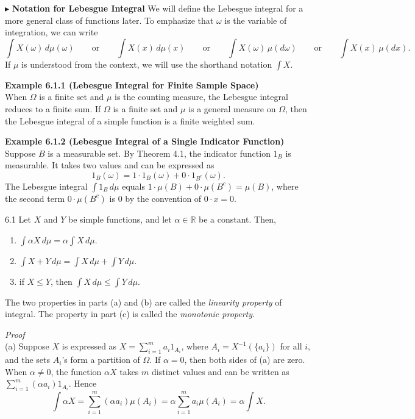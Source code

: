 \noindent$\blacktriangleright$ \textbf{Notation for Lebesgue Integral} We will define the Lebesgue integral for a more general class of functions later. To emphasize that $\omega$ is the variable of integration, we can write
\[
\int X(\omega)\, d\mu(\omega)
\qquad \text{or} \qquad
\int X(x)\, d\mu(x)
\qquad \text{or} \qquad
\int X(\omega)\, \mu(d\omega)
\qquad \text{or} \qquad
\int X(x)\, \mu(dx).
\]
If $\mu$ is understood from the context, we will use the shorthand notation $\int X$.

\textbf{Example 6.1.1 (Lebesgue Integral for Finite Sample Space)} \\
When $\Omega$ is a finite set and $\mu$ is the counting measure, the Lebesgue integral reduces to a finite sum. If $\Omega$ is a finite set and $\mu$ is a general measure on $\Omega$, then the Lebesgue integral of a simple function is a finite weighted sum.

\textbf{Example 6.1.2 (Lebesgue Integral of a Single Indicator Function)} \\
Suppose $B$ is a measurable set. By Theorem 4.1, the indicator function $1_B$ is measurable. It takes two values and can be expressed as
\[
1_B(\omega)=1\cdot 1_B(\omega)+0\cdot 1_{B^c}(\omega).
\]
The Lebesgue integral $\int 1_B\, d\mu$ equals $1\cdot \mu(B)+0\cdot \mu(B^c)=\mu(B)$, where the second term $0\cdot \mu(B^c)$ is $0$ by the convention of $0\cdot x=0$.

\begin{thmbox}{6.1}
Let $X$ and $Y$ be simple functions, and let $\alpha \in \mathbb{R}$ be a constant. Then,
\begin{enumerate}[label=(\alph*)]
    \item $\int \alpha X\, d\mu = \alpha \int X\, d\mu$.
    \item $\int X+Y\, d\mu = \int X\, d\mu + \int Y\, d\mu$.
    \item if $X\le Y$, then $\int X\, d\mu \le \int Y\, d\mu$.
\end{enumerate}
\end{thmbox}

The two properties in parts (a) and (b) are called the \textit{linearity property} of integral. The property in part (c) is called the \textit{monotonic property}.

\textit{Proof} \\
(a) Suppose $X$ is expressed as $X=\sum_{i=1}^{m} a_i 1_{A_i}$, where $A_i=X^{-1}(\{a_i\})$ for all $i$, and the sets $A_i$'s form a partition of $\Omega$. If $\alpha=0$, then both sides of (a) are zero. When $\alpha\neq 0$, the function $\alpha X$ takes $m$ distinct values and can be written as $\sum_{i=1}^{m} (\alpha a_i)1_{A_i}$. Hence
\[
\int \alpha X = \sum_{i=1}^{m} (\alpha a_i)\mu(A_i)
= \alpha \sum_{i=1}^{m} a_i \mu(A_i)
= \alpha \int X.
\]

